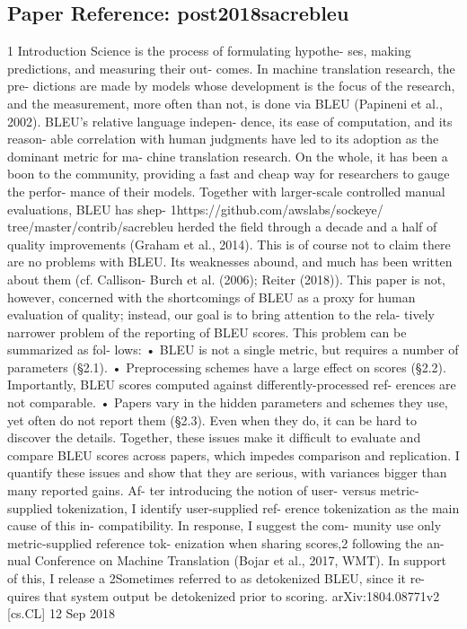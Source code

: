 \subsection*{Paper Reference: post2018sacrebleu}

1 Introduction Science is the process of formulating hypothe- ses, making predictions, and measuring their out- comes. In machine translation research, the pre- dictions are made by models whose development is the focus of the research, and the measurement, more often than not, is done via BLEU (Papineni et al., 2002). BLEU’s relative language indepen- dence, its ease of computation, and its reason- able correlation with human judgments have led to its adoption as the dominant metric for ma- chine translation research. On the whole, it has been a boon to the community, providing a fast and cheap way for researchers to gauge the perfor- mance of their models. Together with larger-scale controlled manual evaluations, BLEU has shep- 1https://github.com/awslabs/sockeye/ tree/master/contrib/sacrebleu herded the ﬁeld through a decade and a half of quality improvements (Graham et al., 2014). This is of course not to claim there are no problems with BLEU. Its weaknesses abound, and much has been written about them (cf. Callison- Burch et al. (2006); Reiter (2018)). This paper is not, however, concerned with the shortcomings of BLEU as a proxy for human evaluation of quality; instead, our goal is to bring attention to the rela- tively narrower problem of the reporting of BLEU scores. This problem can be summarized as fol- lows: • BLEU is not a single metric, but requires a number of parameters (§2.1). • Preprocessing schemes have a large effect on scores (§2.2). Importantly, BLEU scores computed against differently-processed ref- erences are not comparable. • Papers vary in the hidden parameters and schemes they use, yet often do not report them (§2.3). Even when they do, it can be hard to discover the details. Together, these issues make it difﬁcult to evaluate and compare BLEU scores across papers, which impedes comparison and replication. I quantify these issues and show that they are serious, with variances bigger than many reported gains. Af- ter introducing the notion of user- versus metric- supplied tokenization, I identify user-supplied ref- erence tokenization as the main cause of this in- compatibility. In response, I suggest the com- munity use only metric-supplied reference tok- enization when sharing scores,2 following the an- nual Conference on Machine Translation (Bojar et al., 2017, WMT). In support of this, I release a 2Sometimes referred to as detokenized BLEU, since it re- quires that system output be detokenized prior to scoring. arXiv:1804.08771v2 [cs.CL] 12 Sep 2018

